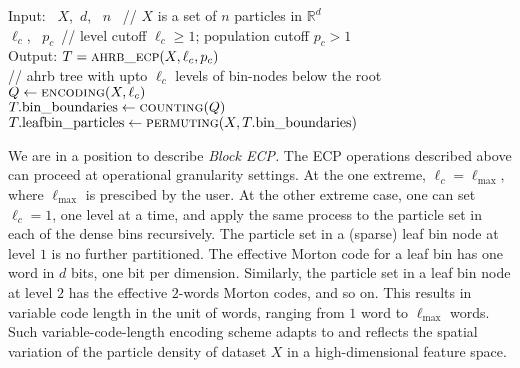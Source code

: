 \documentclass[final]{juliacon}
\begin{document}
\begin{algorithm}[h] 
  \caption{\small%
    {\sc ahrb\_ecp}
    \\ \phantom{make space}
    (the basic ECP module for {\sc ahrb} construction) }
  \label{alg:basic-ECP} 
  \small
  \SetAlgoLined
  {\rm Input:\ }
  $X$,\, $d$, \,  $n$   
   \, \phantom{x}
  // {\footnotesize $X$ is a set of $n$ particles in $\mathbb{R}^d$} 
  \\
  \phantom{Input:\ }
  $\ell_c$, \, $p_c$\,
  \phantom{xxx}
  // {\footnotesize level cutoff $\ell_c\geq 1$;
                    population cutoff $p_c >1$ } 
  \\
 {\rm Output:}\phantom{xx}
  $ T = \mbox{\sc ahrb\_ecp}(X,\ell_c, p_c)$
  \\ \phantom{xxx}
  // {\footnotesize {\sc ahrb} tree with upto $\ell_c$ levels of bin-nodes
    below the root} 
  \\
  $Q  \gets \mbox{\sc encoding}(X,\ell_c)$ 
  \\
  $T.\mbox{\rm bin\textunderscore{}boundaries} \gets \mbox{\sc counting}(Q)$ 
  \\ 
  $ T.\mbox{\rm leafbin\textunderscore{}particles}
  \gets \mbox{\sc permuting}(X,T.\mbox{\rm bin\textunderscore{}boundaries}) $
%
%
\end{algorithm}
 
%
%
%
%
%
%
%


\vspace{2pt}
%
We are in a position to describe {\em Block ECP.} The ECP operations
described above can proceed at operational granularity settings. At
the one extreme, $\ell_c=\ell_{\max}$, where $\ell_{\max}$ is
prescibed by the user. At the other extreme case, one can set $\ell_c
=1$, one level at a time, and apply the same process to the particle
set in each of the dense bins recursively.  The particle set in a
(sparse) leaf bin node at level $1$ is no further partitioned. The
effective Morton code for a leaf bin has one word in $d$ bits, one
bit per dimension. Similarly, the particle set in a leaf bin node at
level $2$ has the effective $2$-words Morton codes, and so on.  This
results in variable code length in the unit of words, ranging from $1$
word to $\ell_{\max}$ words. Such variable-code-length encoding scheme
adapts to and reflects the spatial variation of the particle density
of dataset $X$ in a high-dimensional feature space.
%
\end{document}
